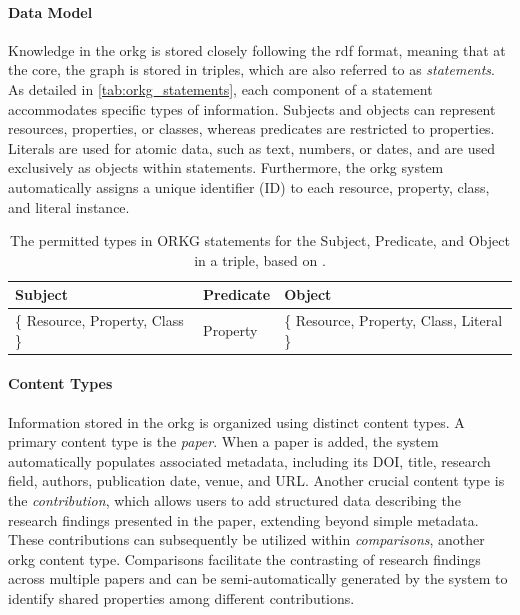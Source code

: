 \paragraph{Data Model} Knowledge in the \gls{orkg} is stored closely following the \gls{rdf} format, meaning that at the core, the graph is stored in triples, which are also referred to as \emph{statements}. As detailed in \autoref{tab:orkg_statements}, each component of a statement accommodates specific types of information. Subjects and objects can represent resources, properties, or classes, whereas predicates are restricted to properties. Literals are used for atomic data, such as text, numbers, or dates, and are used exclusively as objects within statements. Furthermore, the \gls{orkg} system automatically assigns a unique identifier (ID) to each resource, property, class, and literal instance. \cite[21-22]{ilangovan_open_2024}

\begin{table}[t]
\centering
\begin{tabular}{|l|l|l|}
\hline
\textbf{Subject} & \textbf{Predicate} & \textbf{Object} \\ \hline
\{ Resource, Property, Class \} & Property & \{ Resource, Property, Class, Literal \} \\ \hline
\end{tabular}
\caption[Permitted ORKG Statement Types]{The permitted types in ORKG statements for the Subject, Predicate, and Object in a triple, based on \cite[21]{ilangovan_open_2024}.}
\label{tab:orkg_statements}
\end{table}

\paragraph{Content Types} Information stored in the \gls{orkg} is organized using distinct content types. A primary content type is the \emph{paper}. When a paper is added, the system automatically populates associated metadata, including its DOI, title, research field, authors, publication date, venue, and URL. Another crucial content type is the \emph{contribution}, which allows users to add structured data describing the research findings presented in the paper, extending beyond simple metadata. These contributions can subsequently be utilized within \emph{comparisons}, another \gls{orkg} content type. Comparisons facilitate the contrasting of research findings across multiple papers and can be semi-automatically generated by the system to identify shared properties among different contributions. \cite[22]{ilangovan_open_2024}

